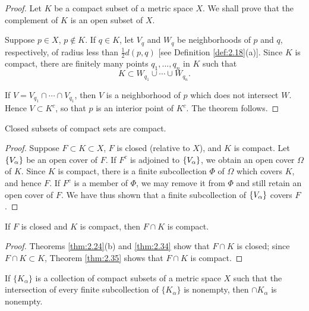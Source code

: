 \begin{proof}
    Let $K$ be a compact subset of a metric space $X$. 
    We shall prove that the complement of $K$ is an open subset of $X$.

    Suppose $p \in X$, $p \not\in K$. 
    If $q \in K$, let $V_q$ and $W_q$ be neighborhoods of $p$ and $q$, 
    respectively, of radius less than $\tfrac{1}{2}d(p, q)$ [see Definition \ref{def:2.18}(a)].
    Since $K$ is compact, there are finitely many points $q_1, ..., q_n$ in $K$ such that
    \begin{equation*}
        K \subset 
        W_{q_1} \cup \cdots \cup
        W_{q_n}. 
    \end{equation*}

    If $V=V_{q_1} \cap \cdots \cap V_{q_1}$, 
    then $V$ is a neighborhood of $p$ which does not intersect $W$. 
    Hence $V \subset K^c$, so that $p$ is an interior point of $K^c$.
    The theorem follows.
\end{proof}

\begin{thm}
    \label{thm:2.35}
    Closed subsets of compact sets are compact.
\end{thm}

\begin{proof}
    Suppose $F \subset K \subset X$, 
    $F$ is closed (relative to $X$), 
    and $K$ is compact. 
    Let $\protect\{V_\alpha\}$ be an open cover of $F$. 
    If $F^c$ is adjoined to $\protect\{V_\alpha\}$, 
    we obtain an open cover $\Omega$ of $K$. 
    Since $K$ is compact, there is a finite subcollection $\Phi$ of $\Omega$ which covers $K$, and hence $F$. 
    If $F^c$ is a member of $\Phi$, 
    we may remove it from $\Phi$ and still retain an open cover of $F$. 
    We have thus shown that a finite subcollection of $\protect\{V_\alpha\}$ covers $F$.
\end{proof}

\begin{myCorollary*}
    If $F$ is closed and $K$ is compact, then $F \cap K$ is compact.
\end{myCorollary*}

\begin{proof}
    Theorems \ref{thm:2.24}(b) and \ref{thm:2.34} show that $F \cap K$ is closed; 
    since $F \cap K \subset K$, 
    Theorem \ref{thm:2.35} shows that $F \cap K$ is compact.
\end{proof}

\begin{thm}
    \label{thm:2.36}
    If $\{K_\alpha\}$ is a collection of compact subsets of a metric space $X$ 
    such that the intersection of every finite subcollection of $\{K_\alpha\}$ is nonempty, 
    then $\cap K_\alpha$ is nonempty.    
\end{thm}


